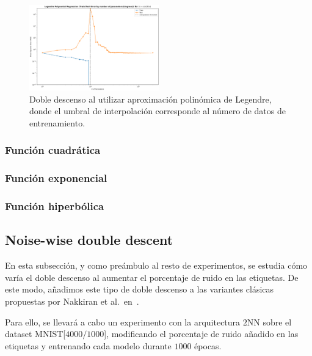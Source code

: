 \begin{figure}[h]
    \centering
    \includegraphics[width=0.5\textwidth]{img/experiments/legendreDDD.png}
    \caption[Doble descenso al utilizar aproximación polinómica de Legendre.]{Doble descenso al utilizar aproximación polinómica de Legendre, donde el umbral de interpolación corresponde al número de datos de entrenamiento.}
    \label{fig:1DDD}
\end{figure}

\subsubsection{Función cuadrática}\label{subsubsec:cuadratica}

\subsubsection{Función exponencial}\label{subsubsec:exponencial}

\subsubsection{Función hiperbólica}\label{subsubsec:hiperbolica}

\subsection{Noise-wise double descent}\label{subsec:noise-wise-dd}

En esta subsección, y como preámbulo al resto de experimentos, se estudia cómo varía el doble descenso al aumentar el porcentaje de ruido en las etiquetas. De este modo, añadimos este tipo de doble descenso a las variantes clásicas propuestas por Nakkiran et al.\ en~\cite{Nakkiran2019}.\newline

Para ello, se llevará a cabo un experimento con la arquitectura $2$NN sobre el dataset MNIST[$4000/1000$], modificando el porcentaje de ruido añadido en las etiquetas y entrenando cada modelo durante $1000$ épocas.\newline

